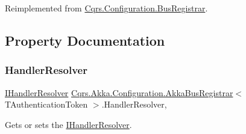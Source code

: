 Reimplemented from \hyperlink{classCqrs_1_1Configuration_1_1BusRegistrar_a3103da4cf077104607fe03a862958827_a3103da4cf077104607fe03a862958827}{Cqrs.\+Configuration.\+Bus\+Registrar}.



\subsection{Property Documentation}
\mbox{\label{classCqrs_1_1Akka_1_1Configuration_1_1AkkaBusRegistrar_a642cd7215c2f51cfaff263f9ba95a4c4_a642cd7215c2f51cfaff263f9ba95a4c4}} 
\subsubsection{\texorpdfstring{Handler\+Resolver}{HandlerResolver}}
{\footnotesize\ttfamily \hyperlink{interfaceCqrs_1_1Akka_1_1Configuration_1_1IHandlerResolver}{I\+Handler\+Resolver} \hyperlink{classCqrs_1_1Akka_1_1Configuration_1_1AkkaBusRegistrar}{Cqrs.\+Akka.\+Configuration.\+Akka\+Bus\+Registrar}$<$ T\+Authentication\+Token $>$.Handler\+Resolver\hspace{0.3cm}{\ttfamily [get]}, {\ttfamily [protected]}}



Gets or sets the \hyperlink{interfaceCqrs_1_1Akka_1_1Configuration_1_1IHandlerResolver}{I\+Handler\+Resolver}. 

